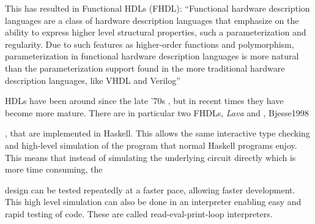 {		This has resulted in Functional HDLs (FHDL): ``Functional hardware
		description languages are a class of hardware description languages
		that emphasize on the ability to express higher level structural
		properties, such a parameterization and regularity. Due to such
		features as higher-order functions and polymorphism, parameterization
		in functional hardware description languages is more natural than the
		parameterization support found in the more traditional hardware
		description languages, like VHDL and Verilog'' \cite{Baaij2009}
		
		HDLs have been around since the late '70s \cite{Chen2012},
		but in recent times they have become more mature\cite{TODO}. There are in
		particular two FHDLs, \emph{Lava} and \clash \cite{Baaij2009},
		Bjesse1998}, that are implemented in Haskell. This allows the same
		interactive type checking and high-level simulation of the program that
		normal Haskell programs enjoy. This means that instead of simulating
		the underlying circuit directly which is more time consuming, the

		design can be tested repeatedly at a faster pace, allowing faster
		development. This high level simulation can also be done in an
		interpreter enabling easy and rapid testing of code. These are called
		read-eval-print-loop interpreters.

